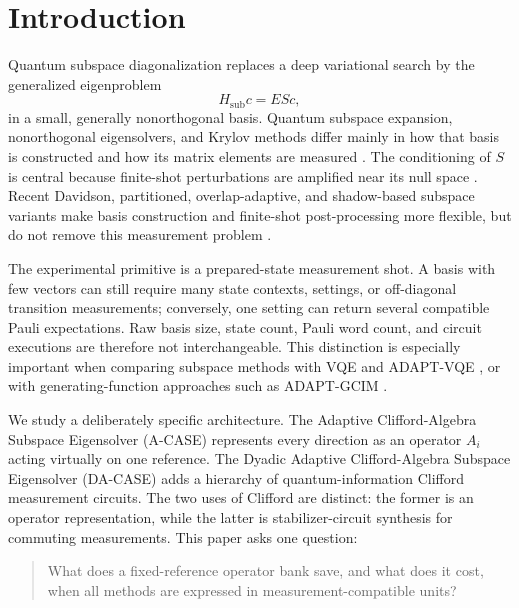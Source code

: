 \documentclass[aps,pra,reprint,superscriptaddress,nofootinbib,floatfix]{revtex4-2}
\begin{document}
\section{Introduction}
\label{sec:introduction}

Quantum subspace diagonalization replaces a deep variational search by the
generalized eigenproblem
\begin{equation}
  H_{\mathrm{sub}}c = E S c ,
  \label{eq:gep}
\end{equation}
in a small, generally nonorthogonal basis.  Quantum subspace expansion,
nonorthogonal eigensolvers, and Krylov methods differ mainly in how that basis
is constructed and how its matrix elements are measured
\cite{mcclean2017qse,huggins2020nonorthogonal,stair2020krylov,bharti2021iqae}.
The conditioning of \(S\) is central because finite-shot perturbations are
amplified near its null space
\cite{epperly2022theory,lee2024sampling,zhang2024measurement}.  Recent
Davidson, partitioned, overlap-adaptive, and shadow-based subspace variants
make basis construction and finite-shot post-processing more flexible, but do
not remove this measurement problem
\cite{tkachenko2024davidson,oleary2025partitioned,feniou2023overlapadapt,
miura2026assqd,boyd2025shadow,fischer2026shadow}.

The experimental primitive is a prepared-state measurement shot.  A basis
with few vectors can still require many state contexts, settings, or
off-diagonal transition measurements; conversely, one setting can return
several compatible Pauli expectations.  Raw basis size, state count, Pauli
word count, and circuit executions are therefore not interchangeable.  This
distinction is especially important when comparing subspace methods with
VQE and ADAPT-VQE \cite{peruzzo2014vqe,grimsley2019adapt}, or with
generating-function approaches such as ADAPT-GCIM \cite{zheng2024adaptgcim}.

We study a deliberately specific architecture.  The Adaptive
Clifford-Algebra Subspace Eigensolver (A-CASE) represents every direction as an
operator \(A_i\) acting virtually on one reference.  The Dyadic Adaptive
Clifford-Algebra Subspace Eigensolver (DA-CASE) adds a hierarchy of
quantum-information Clifford measurement circuits.  The two uses of
Clifford are distinct: the former is an operator representation, while the
latter is stabilizer-circuit synthesis for commuting measurements.  This paper
asks one question:
\begin{quote}
What does a fixed-reference operator bank save, and what does it cost, when
all methods are expressed in measurement-compatible units?
\end{quote}
\end{document}
